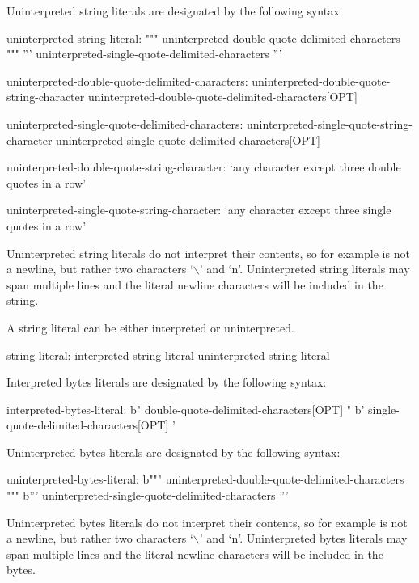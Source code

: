 Uninterpreted string literals are designated by the following syntax:
\begin{syntax}
uninterpreted-string-literal:
  """ uninterpreted-double-quote-delimited-characters """
  ''' uninterpreted-single-quote-delimited-characters '''

uninterpreted-double-quote-delimited-characters:
  uninterpreted-double-quote-string-character uninterpreted-double-quote-delimited-characters[OPT]

uninterpreted-single-quote-delimited-characters:
  uninterpreted-single-quote-string-character uninterpreted-single-quote-delimited-characters[OPT]

uninterpreted-double-quote-string-character:
  `any character except three double quotes in a row'

uninterpreted-single-quote-string-character:
  `any character except three single quotes in a row'
\end{syntax}

Uninterpreted string literals do not interpret their contents, so for
example  is not a newline, but rather two
characters `$\backslash$' and `n'.  Uninterpreted string literals may
span multiple lines and the literal newline characters will be
included in the string.

A string literal can be either interpreted or uninterpreted.
\begin{syntax}
string-literal:
  interpreted-string-literal
  uninterpreted-string-literal
\end{syntax}

\pagebreak
Interpreted bytes literals are designated by the following syntax:
\begin{syntax}
interpreted-bytes-literal:
  b" double-quote-delimited-characters[OPT] "
  b' single-quote-delimited-characters[OPT] '
\end{syntax}

Uninterpreted bytes literals are designated by the following syntax:
\begin{syntax}
uninterpreted-bytes-literal:
  b""" uninterpreted-double-quote-delimited-characters """
  b''' uninterpreted-single-quote-delimited-characters '''
\end{syntax}

Uninterpreted bytes literals do not interpret their contents, so for
example  is not a newline, but rather two
characters `$\backslash$' and `n'.  Uninterpreted bytes literals may
span multiple lines and the literal newline characters will be
included in the bytes.

